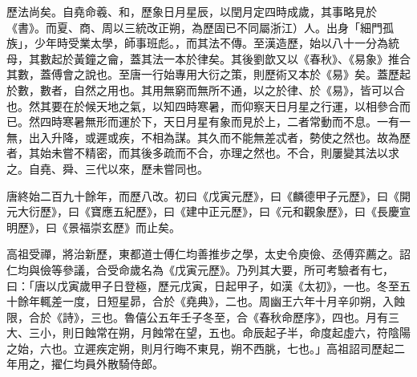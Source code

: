 
\begin{pinyinscope}

 歷法尚矣。自堯命羲、和，歷象日月星辰，以閏月定四時成歲，其事略見於《書》。而夏、商、周以三統改正朔，為歷固已不同屬浙江）人。出身「細門孤族」，少年時受業太學，師事班彪。，而其法不傳。至漢造歷，始以八十一分為統母，其數起於黃鐘之龠，蓋其法一本於律矣。其後劉歆又以《春秋》、《易象》推合其數，蓋傅會之說也。至唐一行始專用大衍之策，則歷術又本於《易》矣。蓋歷起於數，數者，自然之用也。其用無窮而無所不通，以之於律、於《易》，皆可以合也。然其要在於候天地之氣，以知四時寒暑，而仰察天日月星之行運，以相參合而已。然四時寒暑無形而運於下，天日月星有象而見於上，二者常動而不息。一有一無，出入升降，或遲或疾，不相為謀。其久而不能無差忒者，勢使之然也。故為歷者，其始未嘗不精密，而其後多疏而不合，亦理之然也。不合，則屢變其法以求之。自堯、舜、三代以來，歷未嘗同也。



 唐終始二百九十餘年，而歷八改。初曰《戊寅元歷》，曰《麟德甲子元歷》，曰《開元大衍歷》，曰《寶應五紀歷》，曰《建中正元歷》，曰《元和觀象歷》，曰《長慶宣明歷》，曰《景福崇玄歷》而止矣。



 高祖受禪，將治新歷，東都道士傅仁均善推步之學，太史令庾儉、丞傅弈薦之。詔仁均與儉等參議，合受命歲名為《戊寅元歷》。乃列其大要，所可考驗者有七，曰：「唐以戊寅歲甲子日登極，歷元戊寅，日起甲子，如漢《太初》，一也。冬至五十餘年輒差一度，日短星昴，合於《堯典》，二也。周幽王六年十月辛卯朔，入蝕限，合於《詩》，三也。魯僖公五年壬子冬至，合《春秋命歷序》，四也。月有三大、三小，則日蝕常在朔，月蝕常在望，五也。命辰起子半，命度起虛六，符陰陽之始，六也。立遲疾定朔，則月行晦不東見，朔不西朓，七也。」高祖詔司歷起二年用之，擢仁均員外散騎侍郎。




\end{pinyinscope}
